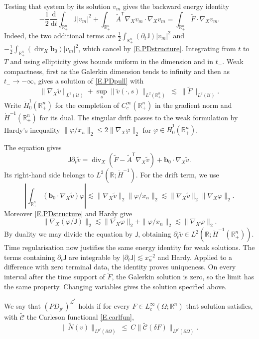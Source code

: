 \documentclass[10pt,a4paper]{amsart}
\numberwithin{equation}{section}
\DeclareMathOperator{\divg}{div}
\newcommand{\R}{\mathbb R}
\newcommand{\wt}{\widetilde}
\newcommand{\om}{\Omega}
\newcommand{\pom}{\partial\Omega}
\newcommand{\pd}{\partial}
\newcommand{\LL}{\mathcal L}
\newcommand{\Uc}{\mathcal U}
\newcommand{\Nt}{\widetilde N}
\renewcommand{\d}{\,\mathrm d}
\begin{document}
Testing that system by its solution $v_m$ gives the backward energy identity
\begin{equation}\label{E.PDenergy}
 -\frac12\frac{\d}{\d t}\int_{\R^n_+}\mathsf J |v_m|^2
 +\int_{\R^n_+}\widetilde A^{\mathsf T}\nabla_Xv_m\cdot\nabla_Xv_m
 =\int_{\R^n_+}\widetilde F\cdot\nabla_Xv_m.
\end{equation}
Indeed, the two additional terms are
$\frac12\int_{\R^n_+}(\pd_t\mathsf J)|v_m|^2$ and
$-\frac12\int_{\R^n_+}(\divg_X\mathbf b_0)|v_m|^2$, which cancel by
\eqref{E.PDstructure}. Integrating from $t$ to $T$ and using ellipticity
gives bounds uniform in the dimension and in $t_-$. Weak compactness, first as
the Galerkin dimension tends to infinity and then as $t_-\to-\infty$, gives a solution
of \eqref{E.PDpull} with
$$\|\nabla_X\widetilde v\|_{L^2(\Uc)}
 +\sup_s\|\widetilde v(\cdot,s)\|_{L^2(\R^n_+)}
 \ \lesssim\ \|\widetilde F\|_{L^2(\Uc)}.$$
Write $\dot H^1_0(\R^n_+)$ for the completion of $C_c^\infty(\R^n_+)$
in the gradient norm and $\dot H^{-1}(\R^n_+)$ for its dual.
The singular drift passes to the weak formulation by Hardy's inequality
$\|\varphi/x_n\|_2\le2\|\nabla_X\varphi\|_2$ for
$\varphi\in\dot H^1_0(\R^n_+)$.

The equation gives
\[
 \mathsf J\pd_t\widetilde v
 =\divg_X(\widetilde F-\widetilde A^{\mathsf T}\nabla_X\widetilde v)
   +\mathbf b_0\cdot\nabla_X\widetilde v.
\]
Its right-hand side belongs to $L^2(\R;\dot H^{-1})$. For the drift term,
we use
\[
 \left|\int_{\R^n_+}(\mathbf b_0\cdot\nabla_X\widetilde v)\varphi\right|
 \lesssim\|\nabla_X\widetilde v\|_2\|\varphi/x_n\|_2
 \lesssim\|\nabla_X\widetilde v\|_2\|\nabla_X\varphi\|_2.
\]
Moreover \eqref{E.PDstructure} and Hardy give
\[
 \|\nabla_X(\varphi/\mathsf J)\|_2
 \lesssim\|\nabla_X\varphi\|_2+\|\varphi/x_n\|_2
 \lesssim\|\nabla_X\varphi\|_2.
\]
By duality we may divide the equation by $\mathsf J$, obtaining
$\pd_t\widetilde v\in L^2(\R;\dot H^{-1}(\R^n_+))$.
Time regularisation now justifies the same energy identity for weak
solutions. The terms containing $\pd_t\mathsf J$ are integrable by
$|\pd_t\mathsf J|\lesssim x_n^{-2}$ and Hardy. Applied to a difference
with zero terminal data, the identity proves uniqueness. On every interval
after the time support of $\widetilde F$, the Galerkin solution is zero, so
the limit has the same property.
Changing variables gives the solution specified above.\medskip

\noindent We say that $(PD_{p'})^{\LL^*}$ holds if for every
$F\in L^\infty_c(\om;\R^n)$ that solution satisfies, with
$\wt{\mathcal C}$ the Carleson functional \eqref{E.carlfun},
$$\big\|\Nt(v)\big\|_{L^{p'}(\pom)}\ \le\
  C\big\|\wt{\mathcal C}(\delta F)\big\|_{L^{p'}(\pom)} .$$
\end{document}
